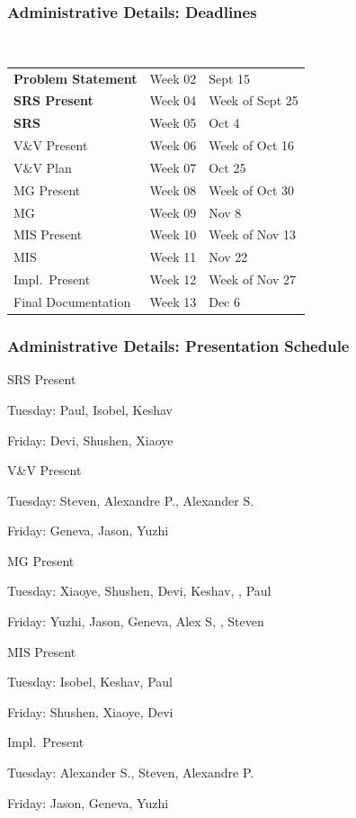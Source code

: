 \documentclass[t,12pt,numbers,fleqn]{beamer}
\begin{document}
\begin{frame}
\frametitle{Administrative Details: Deadlines}
~\newline
\begin{tabular}{l l l}
\textbf{Problem Statement} & Week 02 & Sept 15\\
\textbf{SRS Present} & Week 04 & Week of Sept 25\\
\textbf{SRS} & Week 05 & Oct 4\\
V\&V Present & Week 06 & Week of Oct 16\\
V\&V Plan & Week 07 & Oct 25\\
MG Present & Week 08 & Week of Oct 30\\
MG & Week 09 & Nov 8\\
MIS Present & Week 10 & Week of Nov 13\\
MIS & Week 11 & Nov 22\\
Impl.\ Present & Week 12 & Week of Nov 27\\
Final Documentation & Week 13 & Dec 6\\
\end {tabular}

\end{frame}


\begin{frame}
\frametitle{Administrative Details: Presentation Schedule}

\bi
\item{SRS Present}
\bi
\item Tuesday: Paul, Isobel, Keshav
\item Friday: Devi, Shushen, Xiaoye
\ei
\item V\&V Present
\bi
\item Tuesday: Steven, Alexandre P., Alexander S.
\item Friday: Geneva, Jason, Yuzhi
\ei
\item MG Present
\bi
\item Tuesday: Xiaoye, Shushen, Devi, Keshav, , Paul
\item Friday: Yuzhi, Jason, Geneva, Alex S, , Steven
\ei
\item MIS Present
\bi
\item Tuesday: Isobel, Keshav, Paul
\item Friday: Shushen, Xiaoye, Devi
\ei
\item Impl.\ Present
\bi
\item Tuesday: Alexander S., Steven, Alexandre P.
\item Friday: Jason, Geneva, Yuzhi
\ei

\ei

\end{frame}
\end{document}

